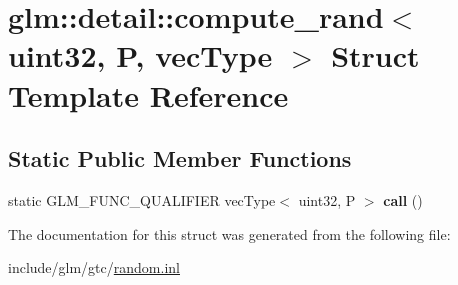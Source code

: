 \hypertarget{structglm_1_1detail_1_1compute__rand_3_01uint32_00_01P_00_01vecType_01_4}{}\section{glm\+:\+:detail\+:\+:compute\+\_\+rand$<$ uint32, P, vec\+Type $>$ Struct Template Reference}
\label{structglm_1_1detail_1_1compute__rand_3_01uint32_00_01P_00_01vecType_01_4}
\subsection*{Static Public Member Functions}
\begin{DoxyCompactItemize}
\item 
\mbox{\label{structglm_1_1detail_1_1compute__rand_3_01uint32_00_01P_00_01vecType_01_4_a17aa209c7dbc4ffabd9373b4b8b99f8a}} 
static G\+L\+M\+\_\+\+F\+U\+N\+C\+\_\+\+Q\+U\+A\+L\+I\+F\+I\+ER vec\+Type$<$ uint32, P $>$ {\bfseries call} ()
\end{DoxyCompactItemize}


The documentation for this struct was generated from the following file\+:\begin{DoxyCompactItemize}
\item 
include/glm/gtc/\hyperlink{random_8inl}{random.\+inl}\end{DoxyCompactItemize}
